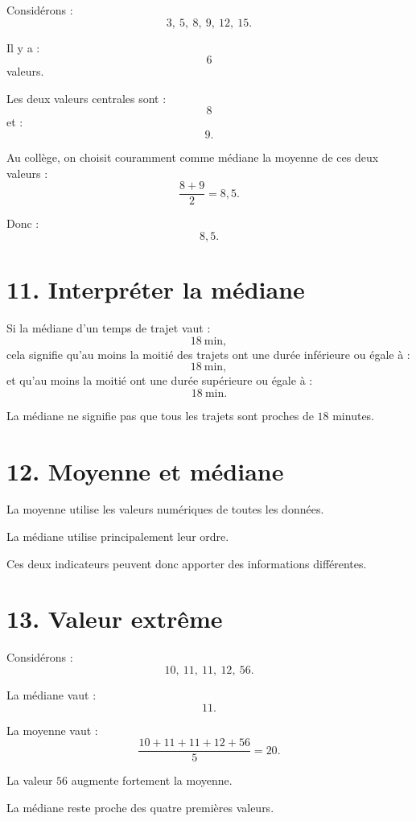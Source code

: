 Considérons :
\[
3,\ 5,\ 8,\ 9,\ 12,\ 15.
\]

Il y a :
\[
6
\]
valeurs.

Les deux valeurs centrales sont :
\[
8
\]
et :
\[
9.
\]

Au collège, on choisit couramment comme médiane la moyenne de ces deux valeurs :
\[
\dfrac{8+9}{2}=8{,}5.
\]

Donc :
\[
\boxed{8{,}5}.
\]

\section{11. Interpréter la médiane}

Si la médiane d'un temps de trajet vaut :
\[
18\ \text{min},
\]
cela signifie qu'au moins la moitié des trajets ont une durée inférieure ou égale à :
\[
18\ \text{min},
\]
et qu'au moins la moitié ont une durée supérieure ou égale à :
\[
18\ \text{min}.
\]

La médiane ne signifie pas que tous les trajets sont proches de $18$ minutes.

\section{12. Moyenne et médiane}

La moyenne utilise les valeurs numériques de toutes les données.

La médiane utilise principalement leur ordre.


Ces deux indicateurs peuvent donc apporter des informations différentes.

\section{13. Valeur extrême}

Considérons :
\[
10,\ 11,\ 11,\ 12,\ 56.
\]

La médiane vaut :
\[
11.
\]

La moyenne vaut :
\[
\dfrac{10+11+11+12+56}{5}
=
20.
\]

La valeur $56$ augmente fortement la moyenne.

La médiane reste proche des quatre premières valeurs.

